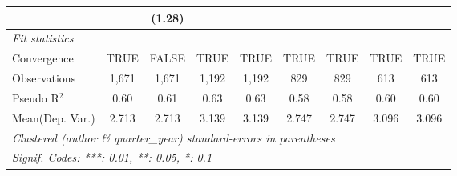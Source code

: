 \begin{tabular}{lcccccccc}
                                                  &         & (1.28)        &       &       &             &               &      &   \\   
   \midrule
   \emph{Fit statistics}\\
   Convergence                                    &TRUE     & FALSE         & TRUE  & TRUE  & TRUE        & TRUE          & TRUE & TRUE\\  
   Observations                                   & 1,671   & 1,671         & 1,192 & 1,192 & 829         & 829           & 613  & 613\\  
   Pseudo R$^2$                                   & 0.60    & 0.61          & 0.63  & 0.63  & 0.58        & 0.58          & 0.60 & 0.60\\  
Mean(Dep. Var.) & 2.713 & 2.713 & 3.139 & 3.139 & 2.747 & 2.747 & 3.096 & 3.096 \\
   \midrule \midrule
   \multicolumn{9}{l}{\emph{Clustered (author \& quarter\_year) standard-errors in parentheses}}\\
   \multicolumn{9}{l}{\emph{Signif. Codes: ***: 0.01, **: 0.05, *: 0.1}}\\
\end{tabular}
\par\endgroup
